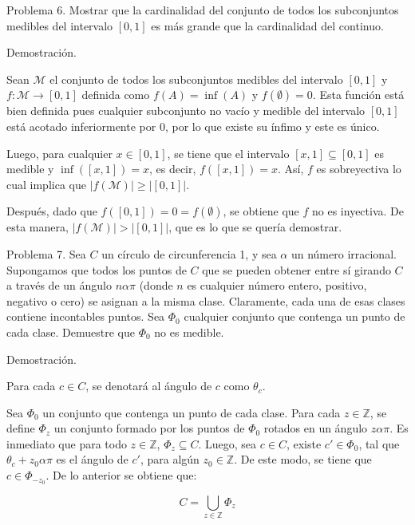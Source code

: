 \documentclass[fleqn]{article}
\begin{document}
	Problema 6. Mostrar que la cardinalidad del conjunto de todos los subconjuntos medibles del intervalo $ [0,1] $ es más grande que la cardinalidad del continuo.

	Demostración.

	Sean $ \mathcal{M} $ el conjunto de todos los subconjuntos medibles del intervalo $ [0,1] $ y $ f \colon \mathcal{M} \to [0,1] $ definida como $ f(A) = \inf(A) $ y $ f(\emptyset) = 0 $. Esta función está bien definida pues cualquier subconjunto no vacío y medible del intervalo $ [0,1] $ está acotado inferiormente por $ 0 $, por lo que existe su ínfimo y este es único.

	Luego, para cualquier $ x \in [0,1] $, se tiene que el intervalo $ [x,1] \subseteq [0,1] $ es medible y $ \inf([x,1]) = x $, es decir, $ f([x,1]) = x $. Así, $ f $ es sobreyectiva lo cual implica que $ \lvert f(\mathcal{M})  \rvert \geq \lvert [0,1] \rvert $.

	Después, dado que $ f([0,1]) = 0 = f(\emptyset) $, se obtiene que $ f $ no es inyectiva. De esta manera, $ \lvert f(\mathcal{M})  \rvert > \lvert [0,1] \rvert $, que es lo que se quería demostrar. 

	Problema 7. Sea $ C $ un círculo de circunferencia 1, y sea $ \alpha $ un número irracional. Supongamos que todos los puntos de $ C $ que se pueden obtener entre sí girando $ C $ a través de un ángulo $ n \alpha \pi $ (donde $n$ es cualquier número entero, positivo, negativo o cero) se asignan a la misma clase. Claramente, cada una de esas clases contiene incontables puntos. Sea $ \Phi_0 $ cualquier conjunto que contenga un punto de cada clase. Demuestre que $ \Phi_0 $ no es medible.

	Demostración.

	Para cada $ c \in C $, se denotará al ángulo de $ c $ como $ \theta_c $.

	Sea $ \Phi_0 $ un conjunto que contenga un punto de cada clase. Para cada $ z \in \mathbb{Z} $, se define $ \Phi_z $ un conjunto formado por los puntos de $ \Phi_0 $ rotados en un ángulo $ z \alpha \pi $. Es inmediato que para todo $ z \in \mathbb{Z} $, $ \Phi_z \subseteq C $. Luego, sea $ c \in C $, existe $ c' \in \Phi_0 $, tal que $ \theta_c + z_0 \alpha \pi $ es el ángulo de $ c' $, para algún $ z_0 \in \mathbb{Z} $. De este modo, se tiene que $ c \in \Phi_{-z_0} $. De lo anterior se obtiene que:

	\begin{equation*}
		C = \bigcup_{z \in \mathbb{Z}} \Phi_z
	\end{equation*}
\end{document}
